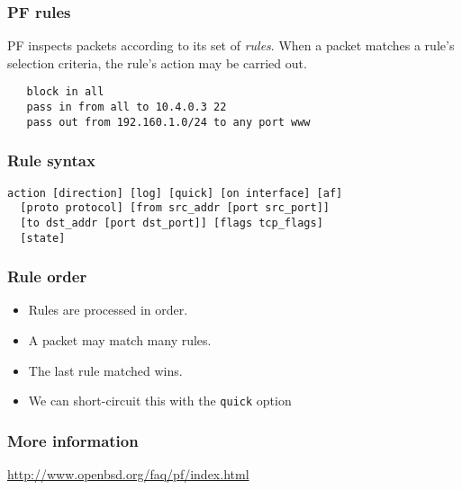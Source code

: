 \documentclass[10pt]{beamer}
\begin{document}
\begin{frame}[fragile]
\frametitle{PF rules}

 PF inspects packets according to its set of \emph{rules}.  When a packet matches a rule's
 selection criteria, the rule's action may be carried out.

 \begin{verbatim}
   block in all
   pass in from all to 10.4.0.3 22
   pass out from 192.160.1.0/24 to any port www
 \end{verbatim}

\end{frame}


\begin{frame}[fragile]
  \frametitle{Rule syntax}

 \begin{verbatim}
action [direction] [log] [quick] [on interface] [af] 
  [proto protocol] [from src_addr [port src_port]] 
  [to dst_addr [port dst_port]] [flags tcp_flags] 
  [state]
 \end{verbatim}

\end{frame}

\begin{frame}
  \frametitle{Rule order}

 \begin{itemize}
	 \item Rules are processed in order.
	 \item A packet may match many rules.  
	 \item The last rule matched wins.
	 \item We can short-circuit this with the \texttt{quick} option
 \end{itemize}
\end{frame}

\begin{frame}
  \frametitle{More information}

 \url{http://www.openbsd.org/faq/pf/index.html}
   



\end{frame}
\end{document}
